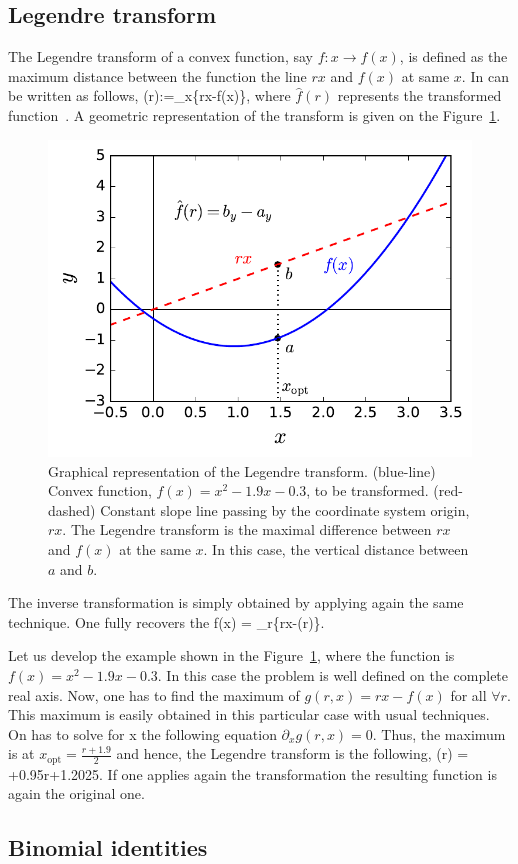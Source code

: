 \subsection{Legendre transform}
\label{app:legendre-transform}

The Legendre transform of a convex function, say $f:x \rightarrow f(x)$, is defined as the maximum distance between the function the line $rx$ and $f(x)$ at same $x$.
In can be written as follows,
\be
  (r):=\max_{x}\{rx-f(x)\},
\ee
where $\hat{f}(r)$ represents the transformed function~\citep{Rockafellar1996}.
A geometric representation of the transform is given on the Figure~\ref{fig:lt-geometric-legendre}.

\begin{figure}[htp]
  \centering
  \includegraphics[scale=.65]{img/plots/LT_legendre.pdf}
  \caption[Graphical representation of the Legendre trasnform.]{Graphical representation of the Legendre transform. (blue-line) Convex function, $f(x)=x^2-1.9x-0.3$, to be transformed. (red-dashed) Constant slope line passing by the coordinate system origin, $rx$. The Legendre transform is the maximal difference between $rx$ and $f(x)$ at the same $x$. In this case, the vertical distance between $a$ and $b$.}
  \label{fig:lt-geometric-legendre}
\end{figure}

The inverse transformation is simply obtained by applying again the same technique.
One fully recovers the
\be
  f(x) = \max_{r}\{rx-(r)\}.
\ee

Let us develop the example shown in the Figure~\ref{fig:lt-geometric-legendre}, where the function is $f(x)=x^2-1.9x-0.3$.
In this case the problem is well defined on the complete real axis.
Now, one has to find the maximum of $g(r,x)=rx-f(x)$ for all $\forall r$.
This maximum is easily obtained in this particular case with usual techniques.
On has to solve for x the following equation $\partial_x g(r,x) = 0$. Thus, the maximum is at $x_{\text{opt}} = \frac{r+1.9}{2}$ and hence, the Legendre transform is the following,
\be
  (r) = +0.95r+1.2025.
\ee
If one applies again the transformation the resulting function is again the original one.

\subsection{Binomial identities}
\label{app:binomial-identities}
